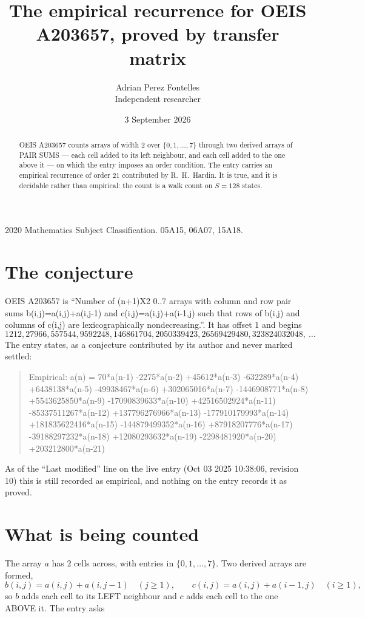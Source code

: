 \documentclass[11pt,a4paper]{article}
\title{The empirical recurrence for OEIS A203657, proved by transfer matrix}
\author{Adrian Perez Fontelles\\ \small Independent researcher}
\date{3 September 2026}
\theoremstyle{plain}
\theoremstyle{definition}
\begin{document}
\maketitle

\begin{abstract}
OEIS A203657 counts arrays of width $2$ over $\{0,1,\dots,7\}$ through two derived arrays of PAIR SUMS ---
each cell added to its left neighbour, and each cell added to the one above it --- on which the
entry imposes an order condition. The entry carries an empirical recurrence of order $21$
contributed by R.~H.~Hardin. It is true, and it is decidable rather than empirical: the count is
a walk count on $S=128$ states.
\end{abstract}

\noindent\small 2020 Mathematics Subject Classification. 05A15, 06A07, 15A18.\normalsize

\section{The conjecture}

OEIS A203657 is ``Number of (n+1)X2 0..7 arrays with column and row pair sums b(i,j)=a(i,j)+a(i,j-1) and c(i,j)=a(i,j)+a(i-1,j) such that rows of b(i,j) and columns of c(i,j) are lexicographically nondecreasing.''. It has offset $1$ and begins
\[
1212, 27966, 557544, 9592248, 146861704, 2050339423, 26569429480, 323824032048,\ \dots
\]
The entry states, as a conjecture contributed by its author and never marked settled:
\begin{quote}
Empirical: a(n) = 70*a(n-1) -2275*a(n-2) +45612*a(n-3) -632289*a(n-4) +6438138*a(n-5) -49938467*a(n-6) +302065016*a(n-7) -1446908771*a(n-8) +5543625850*a(n-9) -17090839633*a(n-10) +42516502924*a(n-11) -85337511267*a(n-12) +137796276966*a(n-13) -177910179993*a(n-14) +181835622416*a(n-15) -144879499352*a(n-16) +87918207776*a(n-17) -39188297232*a(n-18) +12080293632*a(n-19) -2298481920*a(n-20) +203212800*a(n-21)
\end{quote}
As of the ``Last modified'' line on the live entry (Oct 03 2025 10:38:06, revision 10) this is still
recorded as empirical, and nothing on the entry records it as proved.

\section{What is being counted}

The array $a$ has $2$ cells across, with entries in $\{0,1,\dots,7\}$. Two derived arrays are formed,
\[
b(i,j)=a(i,j)+a(i,j-1)\quad(j\ge1),\qquad c(i,j)=a(i,j)+a(i-1,j)\quad(i\ge1),
\]
so $b$ adds each cell to its LEFT neighbour and $c$ adds each cell to the one ABOVE it. The
entry asks
\end{document}
